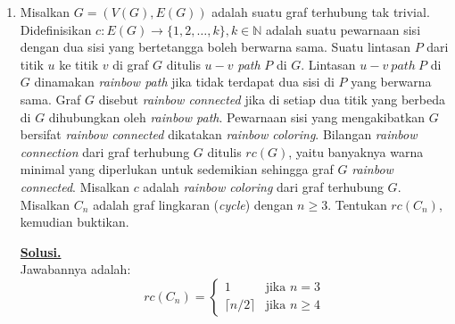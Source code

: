 \documentclass[12pt,twoside]{article}
\newenvironment{solution}
{
	\par\noindent\textbf{\underline{Solusi.}}\\
}
{
	\par
}
\begin{document}
\begin{enumerate}
\begin{solution}
          Andaikan $z_1, z_2, z_3$ adalah titik-titik pada lingkaran berjari-jari $r$ yang berpusat di titik asal $O$.
          Jarak dari $z_3$ ke garis $z_1z_2$ adalah tinggi ($h$) dari segitiga $\triangle z_1 z_2 z_3$ yang ditarik dari titik $z_3$ ke alas $z_1z_2$.
          Luas segitiga $\triangle z_1 z_2 z_3$ (yang titik-titiknya berada pada lingkaran jari-jari $r$) diberikan oleh rumus:
          \[ \text{Luas} = \frac{|z_1-z_2| |z_2-z_3| |z_3-z_1|}{4r}. \]
          Di sisi lain, luas segitiga juga dapat dihitung dengan rumus $\frac{1}{2} \times \text{alas} \times \text{tinggi}$:
          \[ \text{Luas} = \frac{1}{2} |z_1 - z_2| \cdot h. \]
          Dengan menyamakan kedua rumus luas:
          \[ \frac{1}{2} |z_1 - z_2| \cdot h = \frac{|z_1-z_2| |z_2-z_3| |z_3-z_1|}{4r}. \]
          Karena $z_1 \neq z_2$, maka $|z_1 - z_2| \neq 0$, sehingga kita dapat membagi kedua ruas dengan $\frac{1}{2}|z_1-z_2|$:
          \[ h = \frac{|z_2-z_3| |z_3-z_1|}{2r}. \]
          Nilai minimum yang dicari adalah $h$, sehingga terbukti:
          \[ \min |kz_1 + (1-k)z_2 - z_3| = \frac{|z_1-z_3||z_2-z_3|}{2r}. \]
        \end{solution}
  \item Misalkan $G=(V(G),E(G))$ adalah suatu graf terhubung tak trivial. Didefinisikan $c:E(G)\to \{1,2,\dots,k\}, k\in\mathbb{N}$ adalah suatu pewarnaan sisi dengan dua sisi yang bertetangga boleh berwarna sama. Suatu lintasan $P$ dari titik $u$ ke titik $v$ di graf $G$ ditulis $u-v$ \textit{path} $P$ di $G$. Lintasan $u-v~path~P$ di $G$ dinamakan \textit{rainbow path} jika tidak terdapat dua sisi di $P$ yang berwarna sama. Graf $G$ disebut \textit{rainbow connected} jika di setiap dua titik yang berbeda di $G$ dihubungkan oleh \textit{rainbow path}. Pewarnaan sisi yang mengakibatkan $G$ bersifat \textit{rainbow connected} dikatakan \textit{rainbow coloring}. Bilangan \textit{rainbow connection} dari graf terhubung $G$ ditulis $rc(G)$, yaitu banyaknya warna minimal yang diperlukan untuk sedemikian sehingga graf $G$ \textit{rainbow connected}. Misalkan $c$ adalah \textit{rainbow coloring} dari graf terhubung $G$. Misalkan $C_n$ adalah graf lingkaran (\textit{cycle}) dengan $n\geq 3$. Tentukan $rc(C_n)$, kemudian buktikan.
        \begin{solution}
          Jawabannya adalah:
          \[ rc(C_n) = \begin{cases} 1 & \text{jika } n=3 \\ \lceil n/2 \rceil & \text{jika } n \ge 4 \end{cases} \]


\end{solution}
\end{enumerate}
\end{document}
